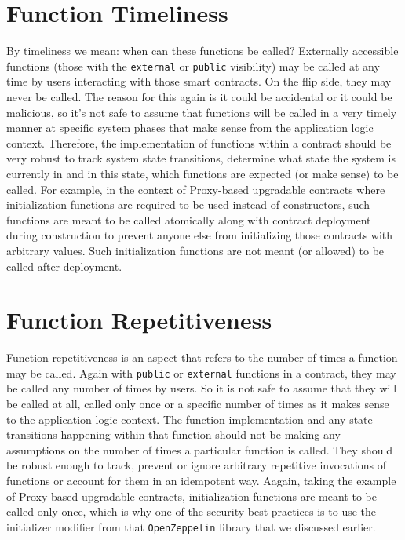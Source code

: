 \section{Function Timeliness}
By timeliness we mean: when can these functions be called? Externally accessible functions (those with the \verb|external| or \verb|public| visibility) may be called at any time by users interacting with those smart contracts. On the flip side, they may never be called. The reason for this again is it could be accidental or it could be malicious, so it's not safe to assume that functions will be called in a very timely manner at specific system phases that make sense from the application logic context. Therefore, the implementation of functions within a contract should be very robust to track system state transitions, determine what state the system is currently in and in this state, which functions are expected (or make sense) to be called. For example, in the context of Proxy-based upgradable contracts where initialization functions are required to be used instead of constructors, such functions are meant to be called atomically along with contract deployment during construction to prevent anyone else from initializing those contracts with arbitrary values. Such initialization functions are not meant (or allowed) to be called after deployment.

\section{Function Repetitiveness}
Function repetitiveness is an aspect that refers to the number of times a function may be called. Again with \verb|public| or \verb|external| functions in a contract, they may be called any number of times by users. So it is not safe to assume that they will be called at all, called only once or a specific number of times as it makes sense to the application logic context. The function implementation and any state transitions happening within that function should not be making any assumptions on the number of times a particular function is called. They should be robust enough to track, prevent or ignore arbitrary repetitive invocations of functions or account for them in an idempotent way. Aagain, taking the example of Proxy-based upgradable contracts, initialization functions are meant to be called only once, which is why one of the security best practices is to use the initializer modifier from that \verb|OpenZeppelin| library that we discussed earlier.

